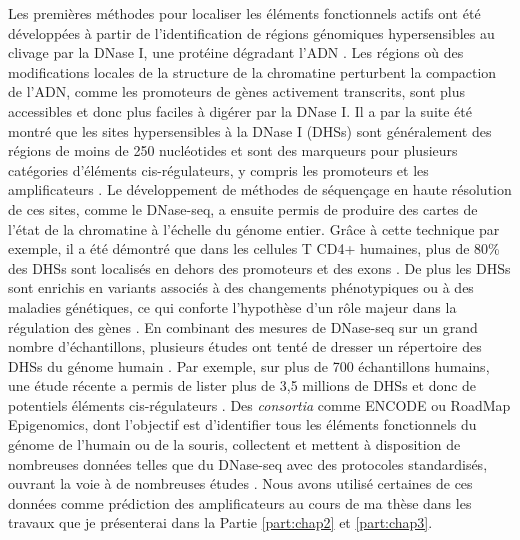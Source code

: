 Les premières méthodes pour localiser les éléments fonctionnels actifs ont été développées à partir de l’identification de régions génomiques hypersensibles au clivage par la DNase I, une protéine dégradant l’ADN \citep{keene_dnase_1981, mcghee_200_1981}. Les régions où des modifications locales de la structure de la chromatine perturbent la compaction de l’ADN, comme les promoteurs de gènes activement transcrits, sont plus accessibles et donc plus faciles à digérer par la DNase I. Il a par la suite été montré que les sites hypersensibles à la DNase I (DHSs) sont généralement des régions de moins de 250 nucléotides et sont des marqueurs pour plusieurs catégories d'éléments \gls{cis}-régulateurs, y compris les promoteurs et les \glspl{amplificateur} \citep{felsenfeld_controlling_2003}. Le développement de méthodes de séquençage en haute résolution de ces sites, comme le DNase-seq, a ensuite permis de produire des cartes de l’état de la chromatine à l’échelle du génome entier. Grâce à cette technique par exemple, il a été démontré que dans les cellules T CD4+ humaines, plus de 80\% des DHSs sont localisés en dehors des promoteurs et des exons \citep{boyle_high-resolution_2008}. De plus les DHSs sont enrichis en variants associés à des changements phénotypiques ou à des maladies génétiques, ce qui conforte l’hypothèse d’un rôle majeur dans la régulation des gènes \citep{maurano_systematic_2012}. En combinant des mesures de DNase-seq sur un grand nombre d'échantillons, plusieurs études ont tenté de dresser un répertoire des DHSs du génome humain \citep{thurman_accessible_2012, meuleman_index_2020}. Par exemple, sur plus de 700 échantillons humains, une étude récente a permis de lister plus de 3,5 millions de DHSs et donc de potentiels éléments \gls{cis}-régulateurs \citep{meuleman_index_2020}. Des \textit{consortia} comme ENCODE ou RoadMap Epigenomics, dont l’objectif est d’identifier tous les éléments fonctionnels du génome de l’humain ou de la souris, collectent et mettent à disposition de nombreuses données telles que du DNase-seq avec des protocoles standardisés, ouvrant la voie à de nombreuses études \citep{davis_encyclopedia_2018, roadmap_epigenomics_consortium_integrative_2015}. Nous avons utilisé certaines de ces données comme prédiction des \glspl{amplificateur} au cours de ma thèse dans les travaux que je présenterai dans la Partie \ref{part:chap2} et \ref{part:chap3}. \\

